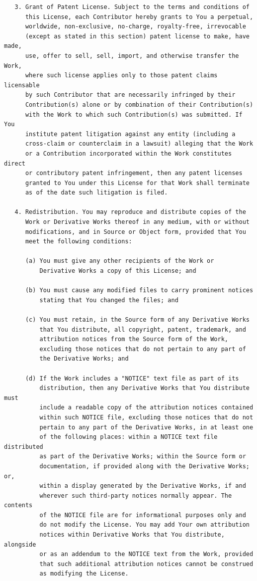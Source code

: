 \begin{verbatim}
   3. Grant of Patent License. Subject to the terms and conditions of
      this License, each Contributor hereby grants to You a perpetual,
      worldwide, non-exclusive, no-charge, royalty-free, irrevocable
      (except as stated in this section) patent license to make, have made,
      use, offer to sell, sell, import, and otherwise transfer the Work,
      where such license applies only to those patent claims licensable
      by such Contributor that are necessarily infringed by their
      Contribution(s) alone or by combination of their Contribution(s)
      with the Work to which such Contribution(s) was submitted. If You
      institute patent litigation against any entity (including a
      cross-claim or counterclaim in a lawsuit) alleging that the Work
      or a Contribution incorporated within the Work constitutes direct
      or contributory patent infringement, then any patent licenses
      granted to You under this License for that Work shall terminate
      as of the date such litigation is filed.

   4. Redistribution. You may reproduce and distribute copies of the
      Work or Derivative Works thereof in any medium, with or without
      modifications, and in Source or Object form, provided that You
      meet the following conditions:

      (a) You must give any other recipients of the Work or
          Derivative Works a copy of this License; and

      (b) You must cause any modified files to carry prominent notices
          stating that You changed the files; and

      (c) You must retain, in the Source form of any Derivative Works
          that You distribute, all copyright, patent, trademark, and
          attribution notices from the Source form of the Work,
          excluding those notices that do not pertain to any part of
          the Derivative Works; and

      (d) If the Work includes a "NOTICE" text file as part of its
          distribution, then any Derivative Works that You distribute must
          include a readable copy of the attribution notices contained
          within such NOTICE file, excluding those notices that do not
          pertain to any part of the Derivative Works, in at least one
          of the following places: within a NOTICE text file distributed
          as part of the Derivative Works; within the Source form or
          documentation, if provided along with the Derivative Works; or,
          within a display generated by the Derivative Works, if and
          wherever such third-party notices normally appear. The contents
          of the NOTICE file are for informational purposes only and
          do not modify the License. You may add Your own attribution
          notices within Derivative Works that You distribute, alongside
          or as an addendum to the NOTICE text from the Work, provided
          that such additional attribution notices cannot be construed
          as modifying the License.


\end{verbatim}

